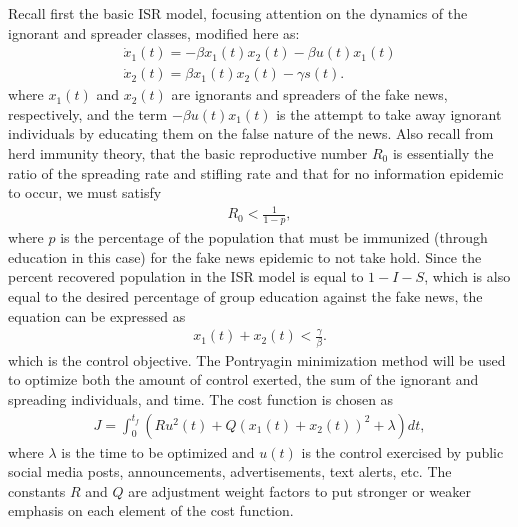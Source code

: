 Recall first the basic ISR model, focusing attention on the dynamics of the ignorant and spreader classes, modified here as:
\begin{equation}
\left.\begin{aligned}
\dot{x}_1(t) = -\beta x_1(t)x_2(t) - \beta u(t)x_1(t)\\
\dot{x}_2(t) = \beta x_1(t)x_2(t) - \gamma s(t).
\end{aligned}\right.
\end{equation}
\noindent where $x_1(t)$ and $x_2(t)$ are ignorants and spreaders of the fake news, respectively, and the term $-\beta u(t)x_1(t)$ is the attempt to take away ignorant individuals by educating them on the false nature of the news.
Also recall from herd immunity theory, that the basic reproductive number $R_0$ is essentially the ratio of the spreading rate and stifling rate and that for no information epidemic to occur, we must satisfy
\begin{equation}
\left.\begin{aligned}
R_0 < \frac{1}{1-p},
\end{aligned}\right.
\end{equation}
\noindent where $p$ is the percentage of the population that must be immunized (through education in this case) for the fake news epidemic to not take hold. Since the percent recovered population in the ISR model is equal to $1-I-S$, which is also equal to the desired percentage of group education against the fake news, the equation can be expressed as
\begin{equation}
\left.\begin{aligned}
x_1(t) + x_2(t) < \frac{\gamma}{\beta}.
\end{aligned}\right.
\end{equation}
\noindent which is the control objective.
The Pontryagin minimization method will be used to optimize both the amount of control exerted, the sum of the ignorant and spreading individuals, and time. The cost function is chosen as
\begin{equation}
\left.\begin{aligned}
J=\int_{0}^{t_f}(Ru^2(t)+Q(x_1(t)+x_2(t))^2 + \lambda )dt,
\end{aligned}\right.
\end{equation}
\noindent where $\lambda$ is the time to be optimized and $u(t)$ is the control exercised by public social media posts, announcements, advertisements, text alerts, etc. The constants $R$ and $Q$ are adjustment weight factors to put stronger or weaker emphasis on each element of the cost function.

